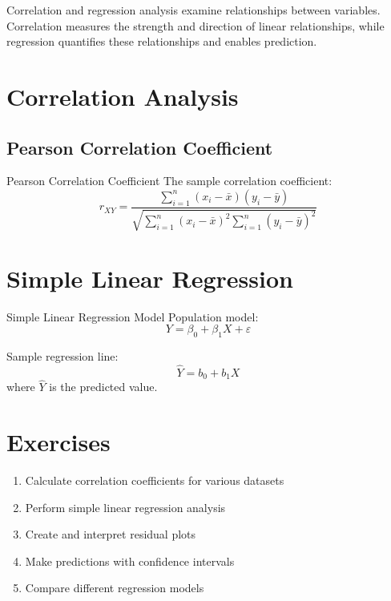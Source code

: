 \documentclass[12pt,a4paper]{book}
\begin{document}
Correlation and regression analysis examine relationships between variables. Correlation measures the strength and direction of linear relationships, while regression quantifies these relationships and enables prediction.

\section{Correlation Analysis}

\subsection{Pearson Correlation Coefficient}

\begin{definition}{Pearson Correlation Coefficient}
The sample correlation coefficient:
\[
r_{XY} = \frac{\sum_{i=1}^{n}(x_i - \bar{x})(y_i - \bar{y})}{\sqrt{\sum_{i=1}^{n}(x_i - \bar{x})^2 \sum_{i=1}^{n}(y_i - \bar{y})^2}}
\]
\end{definition}

\section{Simple Linear Regression}

\begin{definition}{Simple Linear Regression Model}
Population model:
\[
Y = \beta_0 + \beta_1 X + \varepsilon
\]

Sample regression line:
\[
\hat{Y} = b_0 + b_1 X
\]
where $\hat{Y}$ is the predicted value.
\end{definition}

\section{Exercises}

\begin{enumerate}
    \item Calculate correlation coefficients for various datasets
    \item Perform simple linear regression analysis
    \item Create and interpret residual plots
    \item Make predictions with confidence intervals
    \item Compare different regression models
\end{enumerate}

\end{document}
